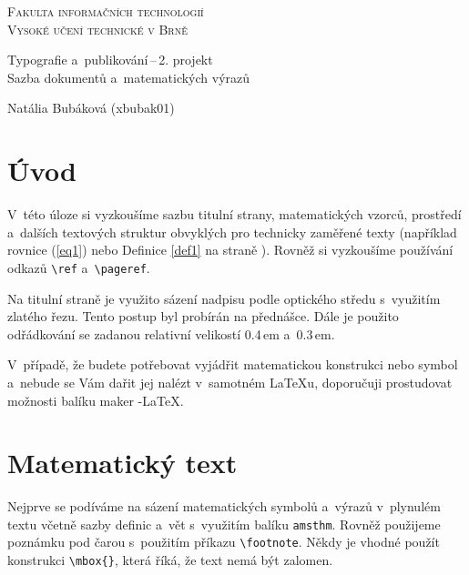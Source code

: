 \documentclass[twocolumn, 11pt]{article}
\begin{document}
\begin{titlepage}
    \begin{center}
        {\Huge\scshape Fakulta informačních technologií \\ \vspace{0.4em}Vysoké učení technické v Brně}
        
        {\LARGE Typografie a~publikování\,--\,2. projekt \\ \vspace{0.3em} Sazba dokumentů a~matematických výrazů}
    \end{center}
    
    {\Large \the\year \hfill Natália Bubáková (xbubak01)}
\end{titlepage}

\newpage

\section*{Úvod}

V~této úloze si vyzkoušíme sazbu titulní strany, matematic\-kých vzorců, prostředí a~dalších textových struktur obvyklých pro technicky zaměřené texty (například rovnice (\ref{eq1}) nebo Definice \ref{def1} na straně \pageref{def1}).
Rovněž si vyzkoušíme používání odkazů \verb|\ref| a~\verb|\pageref|.\par 
Na titulní straně je využito sázení nadpisu podle optického středu s~využitím zlatého řezu. Tento postup byl probírán na přednášce. Dále je použito odřádkování se zadanou relativní velikostí 0.4\,em a~0.3\,em.\par
V~případě, že budete potřebovat vyjádřit matematickou konstrukci nebo symbol a~nebude se Vám dařit jej nalézt v~samotném \LaTeX{}u, doporučuji prostudovat možnosti ba\-lí\-ku maker \AmS-\LaTeX.

\section{Matematický text}
Nejprve se podíváme na sázení matematických symbolů
a~výrazů v~plynulém textu včetně sazby definic a~vět s~využitím balíku \verb|amsthm|. Rovněž použijeme poznámku pod
čarou s~použitím příkazu \verb|\footnote|. Někdy je vhodné použít konstrukci \verb|\mbox{}|, která říká, že text nemá být zalomen.
\end{document}
